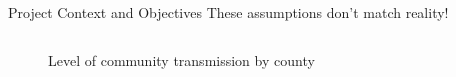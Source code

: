 \begin{slide}{Project Context and Objectives}
	{\large These assumptions don't match reality!}
	\begin{columns}[T]
		\begin{column}{.5\textwidth}
			\begin{figure}
				\centering
				Level of community transmission by county \\
				 \\
			\end{figure}
		\end{column}

\end{columns}
\end{slide}

